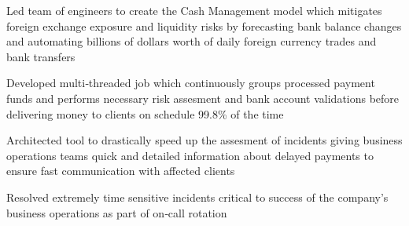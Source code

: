 \documentclass[]{resume}
\begin{document}




\begin{minipage}[t]{0.69\textwidth} 




\separatorLine
{}
\separatorS
\begin{tightemize}
\item Led team of engineers to create the Cash Management model which mitigates foreign exchange exposure and liquidity risks by forecasting bank balance changes and automating billions of dollars worth of daily foreign currency trades and bank transfers
\item Developed multi‑threaded job which continuously groups processed payment funds and performs necessary risk assesment and bank account validations before delivering money to clients on schedule 99.8\% of the time
\item Architected tool to drastically speed up the assesment of incidents giving business operations teams quick and detailed information about delayed payments to ensure fast communication with affected clients
\item Resolved extremely time sensitive incidents critical to success of the company's business operations as part of on‑call rotation
\end{tightemize}
\separatorM


\end{minipage}
\end{document}
